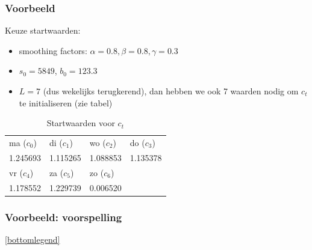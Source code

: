 \documentclass{beamer}
\begin{document}
\begin{frame}
  \frametitle{Voorbeeld}

  Keuze startwaarden:

  \begin{itemize}
    \item smoothing factors: $\alpha = 0.8, \beta = 0.8, \gamma = 0.3$
    \item $s_0 = 5849$, $b_0 = 123.3$
    \item $L = 7$ (dus wekelijks terugkerend), dan hebben we ook 7 waarden nodig om $c_t$ te initialiseren (zie tabel)
  \end{itemize}

  \begin{table}
    \centering
    \begin{tabular}{l|l|l|l}
      ma ($c_0$) & di ($c_1$) & wo ($c_2$) & do ($c_3$)  \\
      1.245693 & 1.115265 & 1.088853 & 1.135378 \\
      \hline \hline
      vr ($c_4$)  & za ($c_5$)  & zo ($c_6$)  & \\
      1.178552 & 1.229739 & 0.006520 &
    \end{tabular}
    \caption{Startwaarden voor $c_t$}
    \label{tab:winters-init-c}
  \end{table}
\end{frame}

\begin{frame}
  \frametitle{Voorbeeld: voorspelling}


  \begin{center}

  \ref{bottomlegend}
\end{center}

\end{frame}
\end{document}
